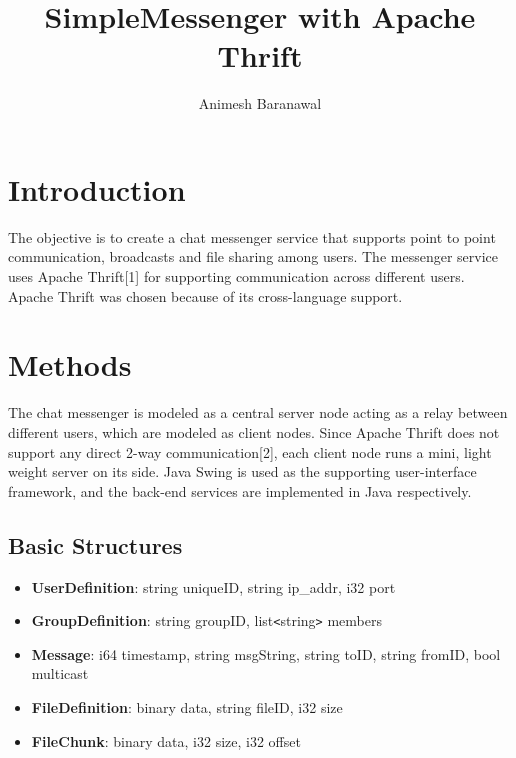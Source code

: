 \documentclass[a4paper,10pt]{article}
\title{SimpleMessenger with Apache Thrift}
\author{Animesh Baranawal}
\begin{document}
\maketitle

\section{Introduction}
The objective is to create a chat messenger service that supports point to point communication, broadcasts and file sharing among users. The messenger service uses Apache Thrift[1] for supporting communication across different users. Apache Thrift was chosen because of its cross-language support.
 
 
\section{Methods}
The chat messenger is modeled as a central server node acting as a relay between different users, which are modeled as client nodes. Since Apache Thrift does not support any direct 2-way communication[2], each client node runs a mini, light weight server on its side. Java Swing is used as the supporting user-interface framework, and the back-end services are implemented in Java respectively.

\subsection{Basic Structures}
\begin{itemize}
    \item \textbf{UserDefinition}: string uniqueID, string ip\_addr, i32 port
    \item \textbf{GroupDefinition}: string groupID, list\texttt{<}string\texttt{>} members
    \item \textbf{Message}: i64 timestamp, string msgString, string toID, string fromID, bool multicast
    \item \textbf{FileDefinition}: binary data, string fileID, i32 size
    \item \textbf{FileChunk}: binary data, i32 size, i32 offset
\end{itemize}
\end{document}
